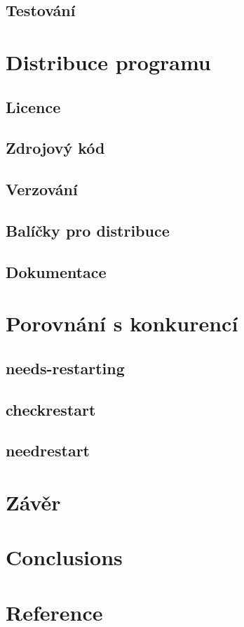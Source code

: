 \documentclass[10pt,a4paper]{article}
\begin{document}
		\subsection{Testování}

	\section{Distribuce programu}
		\subsection{Licence}
		\subsection{Zdrojový kód}
		\subsection{Verzování}
		\subsection{Balíčky pro distribuce}
		\subsection{Dokumentace}

	\section{Porovnání s konkurencí}
		\subsection{needs-restarting}
		\subsection{checkrestart}
		\subsection{needrestart}

	\section{Závěr} %
	\section{Conclusions} %
	\section{Reference} %

\end{document}
